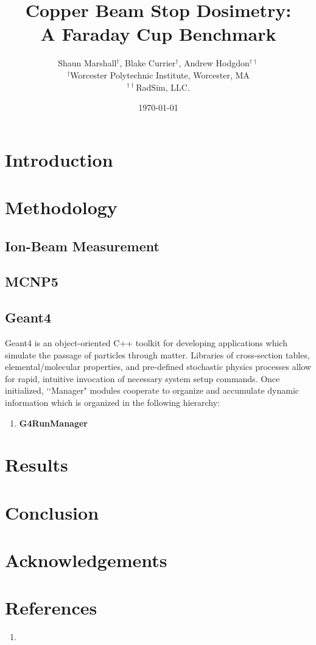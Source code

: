 \documentclass[11pt]{article}
\title{\textbf{Copper Beam Stop Dosimetry:\\A Faraday Cup Benchmark}}
\author{Shaun Marshall$^\dag$, Blake Currier$^\dag$, Andrew Hodgdon$^{\dag\dag}$\\
        $^\dag$Worcester Polytechnic Institute, Worcester, MA\\
        $^{\dag\dag}$RadSim, LLC.}
\date{\today}
\begin{document}
\maketitle

\begin{abstract}
\emph{\lipsum[1]}
\end{abstract}


\section{Introduction}
\lipsum[2-4]


\section{Methodology}
\lipsum[3]


\subsection{Ion-Beam Measurement}
\lipsum[4]


\subsection{MCNP5}
\lipsum[5]


\subsection{Geant4}
Geant4 is an object-oriented C++ toolkit for developing applications which simulate the passage of particles through matter.  Libraries of cross-section tables, elemental/molecular properties, and pre-defined stochastic physics processes allow for rapid, intuitive invocation of necessary system setup commands.  Once initialized, \lq\lq Manager" modules cooperate to organize and accumulate dynamic information which is organized in the following hierarchy:


\begin{enumerate}
\item \textbf{G4RunManager} 
\end{enumerate}


\section{Results}
\lipsum[6-7]
\lipsum[8]
\lipsum[9]


\section{Conclusion}
\lipsum[10-13]


\section{Acknowledgements}
\lipsum[14]


\section{References}
\begin{enumerate}
\item
\end{enumerate}
\end{document}
